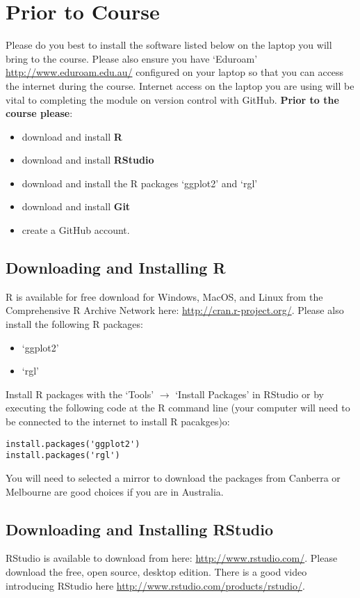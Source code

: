 \documentclass{article}
\begin{document}
\section*{Prior to Course}
Please do you best to install the software listed below on the laptop you will bring to the course.
Please also ensure you have `Eduroam' \url{http://www.eduroam.edu.au/} configured on your laptop so that you can access the internet during the course.  
Internet access on the laptop you are using will be vital to completing the module on version control with GitHub.
\newline
\newline
\textbf{Prior to the course please}: \begin{itemize}
\item download and install \textbf{R}
\item download and install \textbf{RStudio}
\item download and install the R packages `ggplot2' and `rgl'
\item download and install \textbf{Git}
\item create a GitHub account. \end{itemize}

\subsection*{Downloading and Installing R}
R is available for free download for Windows, MacOS, and Linux from the Comprehensive R Archive Network here: \url{http://cran.r-project.org/}.
\newline
\newline
Please also install the following R packages:  \begin{itemize}
 \item `ggplot2'
 \item `rgl' \end{itemize}
Install R packages with the `Tools' $\rightarrow$ `Install Packages' in RStudio or by executing the following code at the R command line (your computer will need to be connected to the internet to install R pacakges)o:
\begin{verbatim}
install.packages('ggplot2')
install.packages('rgl')
\end{verbatim}
You will need to selected a mirror to download the packages from Canberra or Melbourne are good choices if you are in Australia.

\subsection*{Downloading and Installing RStudio}
RStudio is available to download from here: \url{http://www.rstudio.com/}.
Please download the free, open source, desktop edition.
There is a good video introducing RStudio here \url{http://www.rstudio.com/products/rstudio/}.
\end{document}
